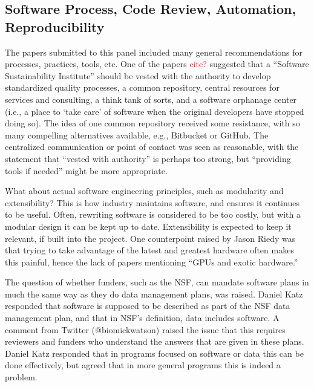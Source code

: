 \documentclass[11pt, oneside]{amsart}
\newcommand{\note}[1]{ {\textcolor{red}    { #1 }}}
\begin{document}
\subsection{Software Process, Code Review, Automation, Reproducibility}

The papers submitted to this panel included many general
recommendations for processes, practices, tools, etc. One of the papers \note{cite?}
suggested that a ``Software Sustainability Institute'' should be vested with
the authority to develop standardized quality processes, a common
repository, central resources for services and consulting, a think tank of
sorts, and a software orphanage center (i.e., a place to `take care' of software
when the original developers have stopped doing so).
The idea of one common repository received
some resistance, with so many compelling alternatives available, e.g., Bitbucket or
GitHub. The centralized communication or point of contact was seen as
reasonable, with the statement that ``vested with authority'' is perhaps too strong,
but ``providing tools if needed'' might be more appropriate.

What about actual software engineering principles, such as modularity and
extensibility? This is how industry maintains software, and ensures it continues
to be useful. Often, rewriting software is considered to be too costly, but
with a modular design it can be kept up to date. Extensibility is expected to keep
it relevant, if built into the project. One counterpoint raised by Jason Riedy
was that trying to take advantage of the latest and greatest hardware often
makes this painful, hence the lack of papers mentioning ``GPUs and exotic
hardware.''

The question of whether funders, such as the NSF, can mandate software plans in
much the same way as they do data management plans, was raised. Daniel Katz responded that
software is supposed to be described as part of the NSF data management plan,
and that in NSF's definition, data includes software. A comment from Twitter
(@biomickwatson) raised the issue that this requires reviewers and funders who
understand the answers that are given in these plans. Daniel Katz responded
that in programs focused on software or data this can be done effectively, but
agreed that in more general programs this is indeed a problem.
\end{document}
